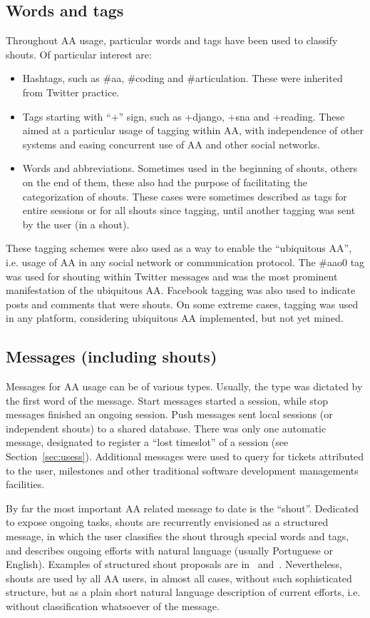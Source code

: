 \documentclass[12pt,fleqn]{article}
\begin{document}
\subsection{Words and tags}\label{sec:usewt}
Throughout AA usage, particular words and tags have been used to classify shouts.
Of particular interest are:
\begin{itemize}
    \item Hashtags, such as \#aa, \#coding and \#articulation.
	    These were inherited from Twitter practice. 
    \item Tags starting with ``+'' sign, such as +django, +sna and +reading.
	    These aimed at a particular usage of tagging within AA,
		with independence of other systems and easing concurrent use of AA and other social networks.
    \item Words and abbreviations.
	    Sometimes used in the beginning of shouts,
		others on the end of them,
		these also had the purpose of facilitating the categorization of shouts.
		These cases were sometimes described as tags for entire sessions 
		or for all shouts since tagging, until another tagging was sent by the user (in a shout).
\end{itemize}

These tagging schemes were also used as a way to enable the ``ubiquitous AA'',
i.e. usage of AA in any social network or communication protocol.
The \#aao0 tag was used for shouting within Twitter messages and was the most prominent manifestation of the ubiquitous AA.
Facebook tagging was also used to indicate posts and comments that were shouts.
On some extreme cases, tagging was used in any platform, considering ubiquitous AA implemented,
but not yet mined.

\subsection{Messages (including shouts)}\label{sec:usesh}
Messages for AA usage can be of various types.
Usually, the type was dictated by the first word of the message.
Start messages started a session, while stop messages finished an ongoing session.
Push messages sent local sessions (or independent shouts) to a shared database.
There was only one automatic message, designated to register a ``lost timeslot''
of a session (see Section~\ref{sec:usess}).
Additional messages were used to query for tickets attributed to the user,
milestones and other traditional software development managements facilities.

By far the most important AA related message to date is the ``shout''.
Dedicated to expose ongoing tasks, shouts are recurrently envisioned as a structured message,
in which the user classifies the shout through special words and tags,
and describes ongoing efforts with natural language (usually Portuguese or English).
Examples of structured shout proposals are in~\cite{aaWiki} and~\cite{aaREADME}.
Nevertheless, shouts are used by all AA users, in almost all cases, without such sophisticated structure,
but as a plain short natural language description of current efforts,
i.e. without classification whatsoever of the message. 
\end{document}
